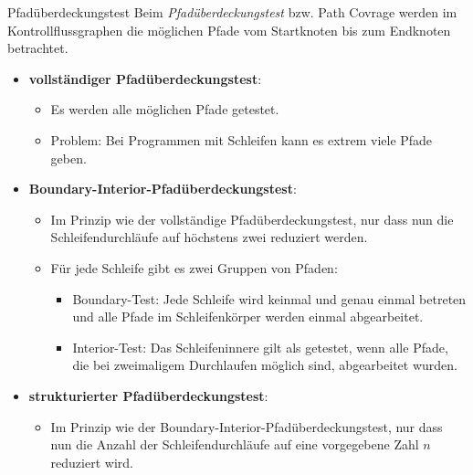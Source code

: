 \begin{defi}{Pfadüberdeckungstest}
    Beim \emph{Pfadüberdeckungstest} bzw. Path Covrage werden im Kontrollflussgraphen die möglichen Pfade vom Startknoten bis zum Endknoten betrachtet.

    \begin{itemize}
        \item \textbf{vollständiger Pfadüberdeckungstest}:
              \begin{itemize}
                  \item Es werden alle möglichen Pfade getestet.
                  \item Problem: Bei Programmen mit Schleifen kann es extrem viele Pfade geben.
              \end{itemize}
        \item \textbf{Boundary-Interior-Pfadüberdeckungstest}:
              \begin{itemize}
                  \item Im Prinzip wie der vollständige Pfadüberdeckungstest, nur dass nun die Schleifendurchläufe auf höchstens zwei reduziert werden.
                  \item Für jede Schleife gibt es zwei Gruppen von Pfaden:
                        \begin{itemize}
                            \item Boundary-Test: Jede Schleife wird keinmal und genau einmal betreten und alle Pfade im Schleifenkörper werden einmal abgearbeitet.
                            \item Interior-Test: Das Schleifeninnere gilt als getestet, wenn alle Pfade, die bei zweimaligem Durchlaufen möglich sind, abgearbeitet wurden.
                        \end{itemize}
              \end{itemize}
        \item \textbf{strukturierter Pfadüberdeckungstest}:
              \begin{itemize}
                  \item Im Prinzip wie der Boundary-Interior-Pfadüberdeckungstest, nur dass nun die Anzahl der Schleifendurchläufe auf eine vorgegebene Zahl $n$ reduziert wird.
              \end{itemize}
    \end{itemize}
\end{defi}

